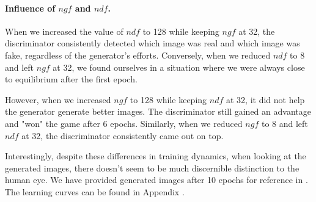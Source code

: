 \paragraph*{Influence of $ngf$ and $ndf$.}

When we increased the value of $ndf$ to 128 while keeping $ngf$ at 32, the discriminator consistently detected which image was real and which image was fake, regardless of the generator's efforts. Conversely, when we reduced $ndf$ to 8 and left $ngf$ at 32, we found ourselves in a situation where we were always close to equilibrium after the first epoch.

However, when we increased $ngf$ to 128 while keeping $ndf$ at 32, it did not help the generator generate better images. The discriminator still gained an advantage and "won" the game after 6 epochs. Similarly, when we reduced $ngf$ to 8 and left $ndf$ at 32, the discriminator consistently came out on top.

Interestingly, despite these differences in training dynamics, when looking at the generated images, there doesn't seem to be much discernible distinction to the human eye. We have provided generated images after 10 epochs for reference in . 
The learning curves can be found in Appendix .

